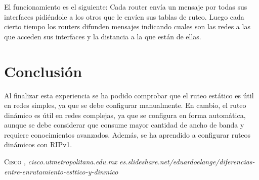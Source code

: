 \documentclass{udpreport}
\begin{document}
\begin{enumerate}
            	El funcionamiento es el siguiente: Cada router envía un mensaje por todas sus interfaces pidiéndole a los otros que le envíen sus tablas de ruteo. Luego cada cierto tiempo los routers difunden mensajes indicando cuales son las redes a las que acceden sus interfaces y la distancia a la que están de ellas.
 
  	     
	\end{enumerate}
	
    
	
\chapter{Conclusión}
 Al finalizar esta experiencia se ha podido comprobar que el ruteo estático es útil en redes simples, ya que se debe configurar
 manualmente. En cambio, el ruteo dinámico es útil en redes complejas, ya que se configura en forma automática, aunque se debe
 considerar que consume mayor cantidad de ancho de banda y requiere conocimientos avanzados. Además, se ha aprendido a configurar
 ruteos dinámicos con RIPv1.\\
\begin{thebibliography}{x}
 \textsc{Cisco },
\textit{cisco.utmetropolitana.edu.mx}
\textit{es.slideshare.net/eduardoelange/diferencias-entre-enrutamiento-esttico-y-dinmico}

\end{thebibliography}
\end{document}
